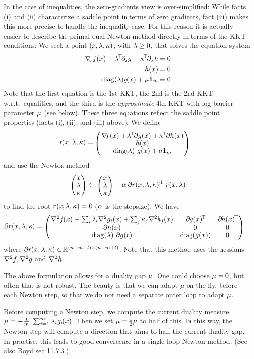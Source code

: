 In the case of inequalities, the zero-gradients view is over-simplified: While facts (i) and (ii) characterize a saddle point
in terms of zero gradients, fact (iii) makes this more precise to
handle the inequality case. For this reason it is actually easier to
describe the primal-dual Newton method directly in terms of the KKT
conditions: We seek a point $(x,\lambda,\kappa)$, with $\lambda\ge0$, that solves the equation system
\begin{align}
  {\nabla_{\!\!}}_x f(x) + \lambda^{\!\top\!} \partial_x g + \kappa^{\!\top\!} \partial_x h &= 0 \\
  h(x) &= 0 \\
  {\rm diag}(\lambda) g(x) + \mu {{\bf 1}}_m &=0
\end{align}
Note that the first equation is the 1st KKT, the 2nd is the 2nd KKT w.r.t.\ equalities, and the third is
the \emph{approximate} 4th KKT with log barrier parameter $\mu$ (see below). These
three equations reflect the saddle point properties (facts (i), (ii),
and (iii) above). We define
\begin{align}
r(x,\l,\k)
&= \mat{c}{
  \na f(x) + \l^\T \del g(x) + \k^\T \del h(x) \\
  h(x) \\
  \diag(\l)~ g(x) + \m \one_m}
\end{align}
and use the Newton method
\begin{equation}
\mat{c}{x\\\l\\\k}
 \gets \mat{c}{x\\\l\\\k} - \a~ \del r(x,\l,\k)^\1~ r(x,\l)
\end{equation}
to find the root $r(x,\lambda,\kappa)=0$ ($\alpha$ is the stepsize). We have
\begin{align}
\del r(x,\l,\k)
 &= \mat{ccc}{
  \he f(x) + \Sum_i \l_i \he g_i(x) + \Sum_j \k_j \he h_j(x) & \del g(x)^\T & \del h(x)^\T \\
  \del h(x) & 0 & 0 \\
  \diag(\l)~ \del g(x) & \diag(g(x)) & 0 
}
\end{align}
where $\partial r(x,\lambda,\kappa) \in {\mathbb{R}}^{(n+m+l)\times(n+m+l)}$.
Note that this method uses the hessians ${\nabla_{\!\!}^2} f, {\nabla_{\!\!}^2} g$ and ${\nabla_{\!\!}^2} h$.

The above formulation allows for a duality gap $\mu$. One could choose
$\mu=0$, but often that is not robust. The beauty is that we can adapt
$\mu$ on the fly, before each Newton step, so that we do not need a
separate outer loop to adapt $\mu$.

Before computing a Newton step, we compute the current duality measure
$\tilde \mu = -\frac{1}{m}~ \sum_{i=1}^m \lambda_i g_i(x)$. Then we set
$\mu = \frac{1}{2} \tilde \mu$ to half of this. In this way, the Newton step
will compute a direction that aims to half the current duality gap. In
practise, this leads to good convercence in a single-loop Newton
method. (See also Boyd sec 11.7.3.)

